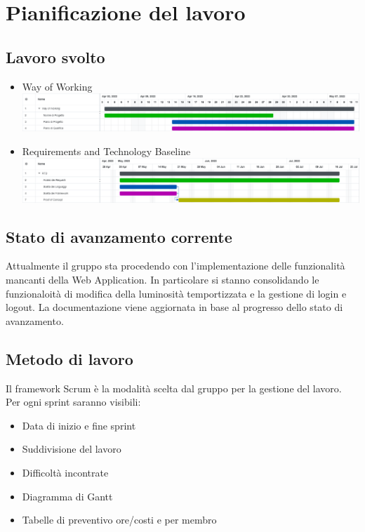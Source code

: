 \documentclass[a4paper, 12pt]{article}
\begin{document}
\newpage
\section{Pianificazione del lavoro}

\subsection{Lavoro svolto}



\begin{itemize}
	\item Way of Working\newline
	      \includegraphics[scale=0.24]{WoW_2.png}\newline
	\item Requirements and Technology Baseline\newline
	      \includegraphics[scale=0.24]{RTB_9.png}\newline
\end{itemize}

\subsection{Stato di avanzamento corrente}
Attualmente il gruppo sta procedendo con l'implementazione delle funzionalità mancanti della Web Application. In particolare si stanno consolidando le funzionaloità di modifica della luminosità temportizzata e la gestione di login e logout.
La documentazione viene aggiornata in base al progresso dello stato di avanzamento.

\subsection{Metodo di lavoro}
Il framework Scrum è la modalità scelta dal gruppo per la gestione del lavoro.
Per ogni sprint saranno visibili:
\begin{itemize}
	\item Data di inizio e fine sprint
	\item Suddivisione del lavoro
	\item Difficoltà incontrate
	\item Diagramma di Gantt
	\item Tabelle di preventivo ore/costi e per membro
\end{itemize}
\end{document}
